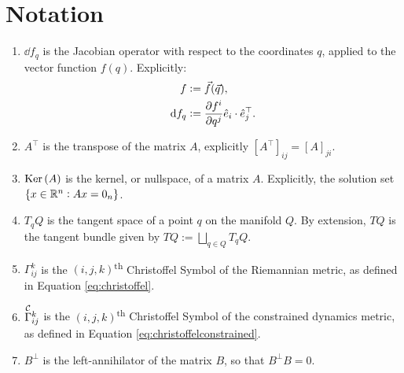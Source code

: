 \documentclass[main.tex]{subfiles}
\begin{document}
\section{Notation}
\begin{enumerate}[(1)]
    \item\label{def:jacobian} $\dd f_q$ is the Jacobian operator with respect to the coordinates $q$, applied to the vector function $f(q)$. Explicitly:
    \begin{align}
        f&:=\Vec{f}(\Vec{q}),\\
        \dd f_q&:= \pdv{f^i}{q^j}\hat{e}_i\cdot\hat{e}^\top_j.
    \end{align}
    \item $A^\top$ is the transpose of the matrix $A$, explicitly $[A^\top]_{ij}=[A]_{ji}$.
    \item $\Ker{A}$ is the kernel, or nullspace, of a matrix $A$. Explicitly, the solution set $\cbr{x\in\ree^n:Ax=0_n}$.
    \item $T_qQ$ is the tangent space of a point $q$ on the manifold $Q$. By extension, $TQ$ is the tangent bundle given by $TQ:=\bigsqcup_{q\in Q} T_qQ.$
    \item $\Gamma^k_{ij}$ is the $(i,j,k)$\textsuperscript{th} Christoffel Symbol of the Riemannian metric, as defined in Equation \ref{eq:christoffel}.
    \item $\Gammac{k}{ij}$ is the $(i,j,k)$\textsuperscript{th} Christoffel Symbol of the constrained dynamics metric, as defined in Equation \ref{eq:christoffelconstrained}.
    \item $B^\bot$ is the left-annihilator of the matrix $B$, so that $B^\bot B=0$.
\end{enumerate}
\end{document}
